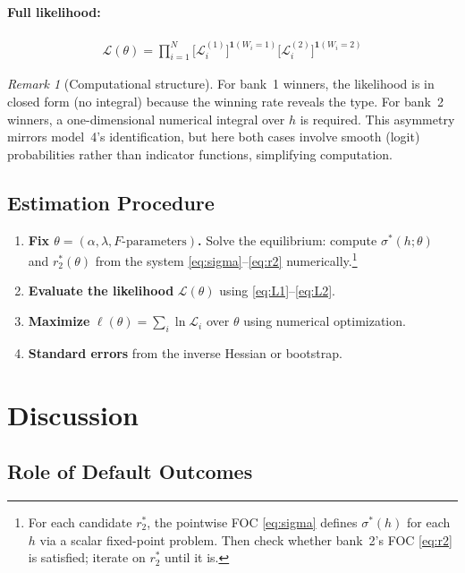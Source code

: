 \documentclass[12pt]{article}
\theoremstyle{plain}
\theoremstyle{plain}
\theoremstyle{definition}  %
\theoremstyle{remark}  %
\newtheorem{remark}[thm]{Remark}  %
\begin{document}
\paragraph{Full likelihood:}
\begin{align}
    \mathcal{L}(\theta) = \prod_{i=1}^N \bigg[\mathcal{L}_i^{(1)}\bigg]^{\mathbf{1}(W_i=1)} \bigg[\mathcal{L}_i^{(2)}\bigg]^{\mathbf{1}(W_i=2)}
\end{align}

\begin{remark}[Computational structure]
For bank~1 winners, the likelihood is in closed form (no integral) because the winning rate reveals the type. For bank~2 winners, a one-dimensional numerical integral over $h$ is required. This asymmetry mirrors model~4's identification, but here both cases involve smooth (logit) probabilities rather than indicator functions, simplifying computation.
\end{remark}

\subsection{Estimation Procedure}

\begin{enumerate}
    \item \textbf{Fix $\theta = (\alpha, \lambda, F\text{-parameters})$.} Solve the equilibrium: compute $\sigma^*(h; \theta)$ and $r_2^*(\theta)$ from the system \eqref{eq:sigma}--\eqref{eq:r2} numerically.\footnote{For each candidate $r_2^*$, the pointwise FOC \eqref{eq:sigma} defines $\sigma^*(h)$ for each $h$ via a scalar fixed-point problem. Then check whether bank~2's FOC \eqref{eq:r2} is satisfied; iterate on $r_2^*$ until it is.}
    \item \textbf{Evaluate the likelihood} $\mathcal{L}(\theta)$ using \eqref{eq:L1}--\eqref{eq:L2}.
    \item \textbf{Maximize} $\ell(\theta) = \sum_i \ln \mathcal{L}_i$ over $\theta$ using numerical optimization.
    \item \textbf{Standard errors} from the inverse Hessian or bootstrap.
\end{enumerate}


\section{Discussion}\label{sec:discussion}

\subsection{Role of Default Outcomes}
\end{document}
